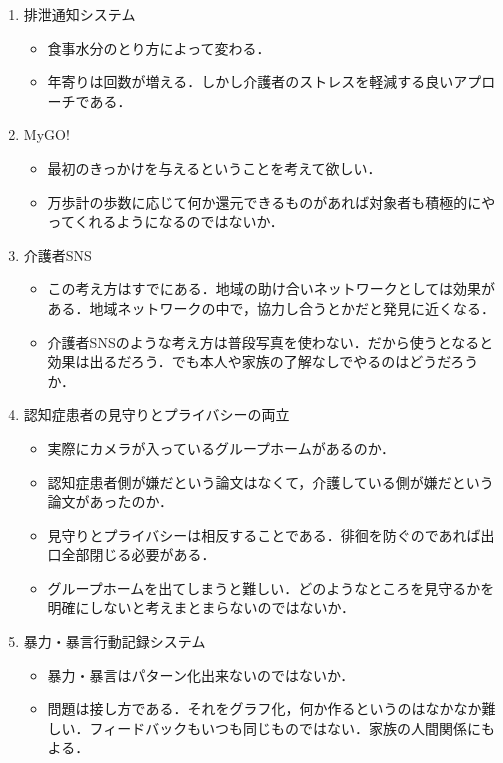 \documentclass[../report]{subfiles}
\begin{document}
\begin{enumerate}
    \item[] 排泄通知システム
\begin{itemize}
    \item 食事水分のとり方によって変わる．
    \item 年寄りは回数が増える．しかし介護者のストレスを軽減する良いアプローチである．
\end{itemize}

    \item[] MyGO!
\begin{itemize}
    \item 最初のきっかけを与えるということを考えて欲しい．
    \item 万歩計の歩数に応じて何か還元できるものがあれば対象者も積極的にやってくれるようになるのではないか．
\end{itemize}

    \item[] 介護者SNS
\begin{itemize}
    \item この考え方はすでにある．地域の助け合いネットワークとしては効果がある．地域ネットワークの中で，協力し合うとかだと発見に近くなる．
    \item 介護者SNSのような考え方は普段写真を使わない．だから使うとなると効果は出るだろう．でも本人や家族の了解なしでやるのはどうだろうか．
\end{itemize}

    \item[] 認知症患者の見守りとプライバシーの両立
\begin{itemize}
    \item 実際にカメラが入っているグループホームがあるのか．
    \item 認知症患者側が嫌だという論文はなくて，介護している側が嫌だという論文があったのか．
    \item 見守りとプライバシーは相反することである．徘徊を防ぐのであれば出口全部閉じる必要がある．
    \item グループホームを出てしまうと難しい．どのようなところを見守るかを明確にしないと考えまとまらないのではないか．
\end{itemize}

    \item[] 暴力・暴言行動記録システム
\begin{itemize}
    \item 暴力・暴言はパターン化出来ないのではないか．
    \item 問題は接し方である．それをグラフ化，何か作るというのはなかなか難しい．フィードバックもいつも同じものではない．家族の人間関係にもよる．
\end{itemize}
\end{enumerate}
\end{document}
